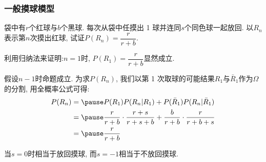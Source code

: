 \documentclass[Prob-All.tex]{subfiles}
\begin{document}
\begin{frame}
	\frametitle{一般摸球模型}
	\begin{exam}
		袋中有$r$个红球与$b$个黑球. 每次从袋中任摸出 1 球并连同$s$个同色球一起放回. 以$R_n$表示第$n$次摸出红球, 试证$P(R_n)=\dfrac{r}{r+b}$.
	\end{exam}

	\pause
	\zheng 利用归纳法来证明:$n=1$时, $P(R_1)=\dfrac{r}{r+b}$显然成立.

	\pause 假设$n-1$时命题成立. 为求$P(R_n)$, 我们以第 1 次取球的可能结果$R_1$与$\bar{R}_1$作为$\Omega$的分割, 用全概率公式可得:
	\pause
	\begin{align*}
		P(R_n)&=\pause P(R_1)P(R_n|R_1)+P(\bar{R}_1)P(R_n|\bar{R}_1)\\
		&= \pause\dfrac{r}{r+b}\cdot \dfrac{r+s}{r+s+b}+\dfrac{b}{r+b}\cdot \dfrac{r}{r+b+s}\\
		&=\pause\dfrac{r}{r+b}
	\end{align*}
	\pause
	\begin{rmk}
		当$s=0$时相当于放回摸球, 而$s=-1$相当于不放回摸球.
	\end{rmk}

\end{frame}
\end{document}
